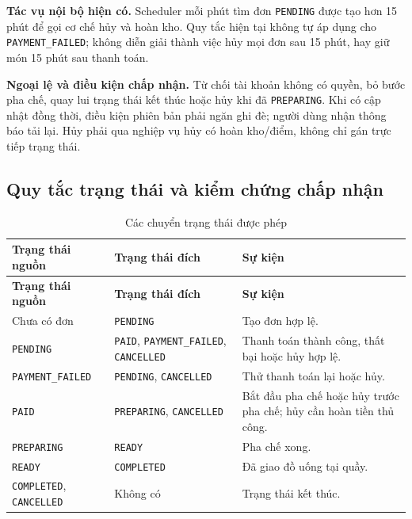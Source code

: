 \textbf{Tác vụ nội bộ hiện có.} Scheduler mỗi phút tìm đơn
\texttt{PENDING} được tạo hơn 15 phút để gọi cơ chế hủy và hoàn kho.
Quy tắc hiện tại không tự áp dụng cho \texttt{PAYMENT\_FAILED}; không
diễn giải thành việc hủy mọi đơn sau 15 phút, hay giữ món 15 phút sau thanh toán.

\textbf{Ngoại lệ và điều kiện chấp nhận.} Từ chối tài khoản không có
quyền, bỏ bước pha chế, quay lui trạng thái kết thúc hoặc hủy khi đã
\texttt{PREPARING}. Khi có cập nhật đồng thời, điều kiện phiên bản phải
ngăn ghi đè; người dùng nhận thông báo tải lại. Hủy phải qua nghiệp vụ
hủy có hoàn kho/điểm, không chỉ gán trực tiếp trạng thái.

\subsection{Quy tắc trạng thái và kiểm chứng chấp nhận}

\begin{longtable}{|p{3.1cm}|p{5.8cm}|p{5.2cm}|}
\caption{Các chuyển trạng thái được phép}
\label{tab:order-transitions}\\ \hline
\textbf{Trạng thái nguồn} & \textbf{Trạng thái đích} & \textbf{Sự kiện} \\ \hline
\endfirsthead
\hline \textbf{Trạng thái nguồn} & \textbf{Trạng thái đích} & \textbf{Sự kiện} \\ \hline
\endhead
Chưa có đơn & \texttt{PENDING} & Tạo đơn hợp lệ. \\ \hline
\texttt{PENDING} & \texttt{PAID}, \texttt{PAYMENT\_FAILED},
\texttt{CANCELLED} & Thanh toán thành công, thất bại hoặc hủy hợp lệ. \\ \hline
\texttt{PAYMENT\_FAILED} & \texttt{PENDING}, \texttt{CANCELLED} & Thử
thanh toán lại hoặc hủy. \\ \hline
\texttt{PAID} & \texttt{PREPARING}, \texttt{CANCELLED} & Bắt đầu pha
chế hoặc hủy trước pha chế; hủy cần hoàn tiền thủ công. \\ \hline
\texttt{PREPARING} & \texttt{READY} & Pha chế xong. \\ \hline
\texttt{READY} & \texttt{COMPLETED} & Đã giao đồ uống tại quầy. \\ \hline
\texttt{COMPLETED}, \texttt{CANCELLED} & Không có & Trạng thái kết thúc. \\ \hline
\end{longtable}

